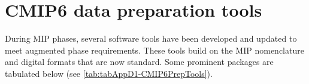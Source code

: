\documentclass[gmd, preprint]{copernicus}
\newcommand{\mycomment}[1]{}
\begin{document}
\mycomment{
What do we need DOI'd - can zenodo work?
CMIP2: https://pcmdi.llnl.gov/mips/cmip2/
CMIP3: https://pcmdi.llnl.gov/mips/cmip3/experiment.html
CMIP5: https://pcmdi.llnl.gov/mips/cmip5/requirements.html
standard_output doc - with coverpage (Karl)
ODS2.5: Gleckler et al. 2024 https://docs.google.com/document/d/1bTi5-CKR8xBCA4e3egc4FXJ93LuUfrhyEBHpUCVgZuo/edit
Also Potter et al. 2011 https://doi.org/10.1175/2011BAMS3018.1
}


\section{CMIP6 data preparation tools}  %
\label{sec:secAppD1-CMIP6DataPrep}

During MIP phases, several software tools have been developed and updated to meet augmented phase requirements. These tools build on the MIP nomenclature and digital formats that are now standard. Some prominent packages are tabulated below (see \autoref{tab:tabAppD1-CMIP6PrepTools}).
\end{document}
